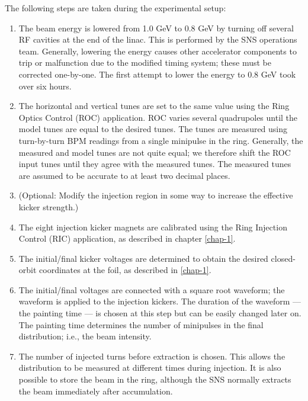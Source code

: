 The following steps are taken during the experimental setup:
%
\begin{enumerate}
    \item 
    The beam energy is lowered from 1.0 GeV to 0.8 GeV by turning off several RF cavities at the end of the linac. This is performed by the SNS operations team. Generally, lowering the energy causes other accelerator components to trip or malfunction due to the modified timing system; these must be corrected one-by-one. The first attempt to lower the energy to 0.8 GeV took over six hours.
    \item
    The horizontal and vertical tunes are set to the same value using the Ring Optics Control (ROC) application. ROC varies several quadrupoles until the model tunes are equal to the desired tunes. The tunes are measured using turn-by-turn BPM readings from a single minipulse in the ring. Generally, the measured and model tunes are not quite equal; we therefore shift the ROC input tunes until they agree with the measured tunes. The measured tunes are assumed to be accurate to at least two decimal places.
    \item
    (Optional: Modify the injection region in some way to increase the effective kicker strength.)
    \item
    The eight injection kicker magnets are calibrated using the Ring Injection Control (RIC) application, as described in chapter \ref{chap-1}. 
    \item
    The initial/final kicker voltages are determined to obtain the desired closed-orbit coordinates at the foil, as described in \ref{chap-1}.
    \item
    The initial/final voltages are connected with a square root waveform; the waveform is applied to the injection kickers. The duration of the waveform — the painting time — is chosen at this step but can be easily changed later on. The painting time determines the number of minipulses in the final distribution; i.e., the beam intensity.
    \item
    The number of injected turns before extraction is chosen. This allows the distribution to be measured at different times during injection.  It is also possible to store the beam in the ring, although the SNS normally extracts the beam immediately after accumulation.
\end{enumerate}
%
